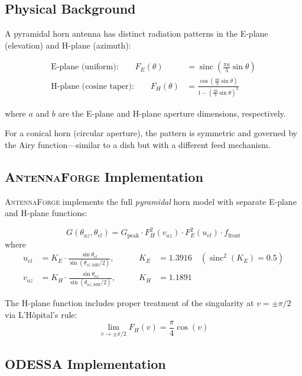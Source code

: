 \documentclass[11pt,a4paper]{article}
\newcommand{\AF}{\textsc{AntennaForge}}
\newcommand{\OD}{\textsc{ODESSA}}
\newcommand{\sinc}{\operatorname{sinc}}
\begin{document}
\subsection{Physical Background}

A pyramidal horn antenna has distinct radiation patterns in the E-plane
(elevation) and H-plane (azimuth):

\begin{align}
  \text{E-plane (uniform):} \qquad
    F_E(\theta) &= \sinc\!\left(\frac{\pi a}{\lambda}\sin\theta\right)
    \label{eq:horn_e} \\[6pt]
  \text{H-plane (cosine taper):} \qquad
    F_H(\theta) &= \frac{\cos\!\left(\frac{\pi b}{\lambda}\sin\theta\right)}
         {1 - \left(\frac{2b}{\lambda}\sin\theta\right)^2}
    \label{eq:horn_h}
\end{align}

where $a$ and $b$ are the E-plane and H-plane aperture dimensions, respectively.

For a conical horn (circular aperture), the pattern is symmetric and governed
by the Airy function---similar to a dish but with a different feed mechanism.

\subsection{\AF{} Implementation}

\AF{} implements the full \emph{pyramidal} horn model with separate E-plane
and H-plane functions:

\begin{equation}
  G(\theta_{az}, \theta_{el}) = G_{\text{peak}} \cdot
    F_H^2(v_{az}) \cdot F_E^2(u_{el}) \cdot f_{\text{front}}
\end{equation}
where
\begin{align}
  u_{el} &= K_E \cdot \frac{\sin\theta_{el}}{\sin(\theta_{el,3\text{dB}}/2)},
  &\qquad K_E &= 1.3916 \quad (\sinc^2(K_E) = 0.5) \\
  v_{az} &= K_H \cdot \frac{\sin\theta_{az}}{\sin(\theta_{az,3\text{dB}}/2)},
  &\qquad K_H &= 1.1891
\end{align}

The H-plane function includes proper treatment of the singularity at
$v = \pm\pi/2$ via L'H\^{o}pital's rule:
\[
  \lim_{v \to \pm\pi/2} F_H(v) = \frac{\pi}{4}\cos(v)
\]

\subsection{\OD{} Implementation}
\end{document}
